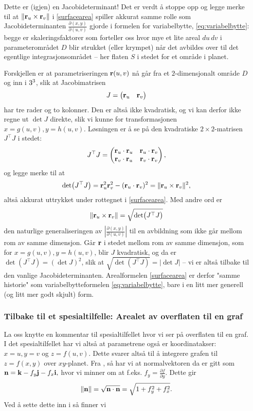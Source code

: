 \begin{rem}{Dette er (igjen) en Jacobideterminant!}
Det er verdt å stoppe opp og legge merke til at $\lVert \mathbf{r}_u \times \mathbf{r}_v\rVert$ i \eqref{surfacearea} spiller akkurat samme rolle som Jacobideterminanten $\frac{\partial(x,y)}{\partial(u,v)}$ gjorde i formelen for variabelbytte, \eqref{eq:variabelbytte}: begge er skaleringsfaktorer som forteller oss hvor mye et lite areal $du\,dv$ i parameterområdet $D$ blir strukket (eller krympet) når det avbildes over til det egentlige integrasjonsområdet -- her flaten $S$ i stedet for et område i planet.

Forskjellen er at parametriseringen $\mathbf{r}(u,v)$ nå går fra et $2$-dimensjonalt område $D$ og inn i $3^3$, slik at Jacobimatrisen
\[
J=\begin{pmatrix}\mathbf{r}_u & \mathbf{r}_v\end{pmatrix}
\]
har tre rader og to kolonner. Den er altså ikke kvadratisk, og vi kan derfor ikke regne ut $\det J$ direkte, slik vi kunne for transformasjonen $x=g(u,v),y=h(u,v)$. Løsningen er å se på den kvadratiske $2\times 2$-matrisen $J^\top J$ i stedet:
\[
J^\top J = \begin{pmatrix} \mathbf{r}_u\cdot\mathbf{r}_u & \mathbf{r}_u\cdot\mathbf{r}_v \\ \mathbf{r}_v\cdot\mathbf{r}_u & \mathbf{r}_v\cdot\mathbf{r}_v\end{pmatrix},
\]
og legge merke til at
\[
\det\bigl(J^\top J\bigr) = \mathbf{r}_u^2\mathbf{r}_v^2-(\mathbf{r}_u\cdot\mathbf{r}_v)^2 = \lVert \mathbf{r}_u\times\mathbf{r}_v\rVert^2,
\]
altså akkurat uttrykket under rottegnet i \eqref{surfacearea}. Med andre ord er
\[
\lVert \mathbf{r}_u\times\mathbf{r}_v\rVert = \sqrt{\det\bigl(J^\top J\bigr)}
\]
den naturlige generaliseringen av $\left|\frac{\partial(x,y)}{\partial(u,v)}\right|$ til en avbildning som ikke går mellom rom av samme dimensjon. Går $\mathbf{r}$ i stedet mellom rom av samme dimensjon, som for $x=g(u,v), y=h(u,v)$, blir $J$ kvadratisk, og da er $\det(J^\top J)=(\det J)^2$, slik at $\sqrt{\det(J^\top J)}=\lvert \det J\rvert$ -- vi er altså tilbake til den vanlige Jacobideterminanten. Arealformelen \eqref{surfacearea} er derfor "samme historie" som variabelbytteformelen \eqref{eq:variabelbytte}, bare i en litt mer generell (og litt mer godt skjult) form.
\end{rem}

\subsubsection{Tilbake til et spesialtilfelle: Arealet av overflaten til en graf}
La oss knytte en kommentar til spesialtilfellet hvor vi ser på overflaten til en graf. I det spesialtilfellet har vi altså at parametrene også er koordinatakser: $x=u,y=v$ og  $z=f(u,v)$. Dette svarer altså til å integrere grafen til $z=f(x,y)$ over $xy$-planet. Fra , så har vi at normalvektoren da er gitt som
\(\mathbf{n}=\mathbf{k}-f_y\mathbf{j}-f_x\mathbf{i},\) hvor vi minner om at f.eks. $f_y=\frac{\partial f}{\partial y}$.
Dette gir 
\[ \|\mathbf{n}\|=\sqrt{\mathbf{n}\cdot\mathbf{n}}=\sqrt{1+f_y^2+f_x^2}.\] Ved å sette dette inn i  så finner vi

